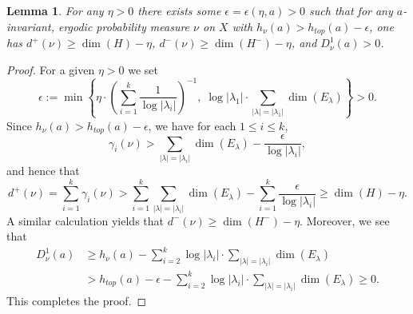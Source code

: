 \documentclass[reqno,12pt]{amsart}
\newtheorem{lemma}[theorem]{Lemma}
\theoremstyle{definition}
\numberwithin{equation}{section}
\newcommand{\Ad}{\mathrm{Ad}}
\begin{document}
{%

\begin{lemma}\label{L:dimclose}
For any $\eta>0$ there exists some $\epsilon=\epsilon(\eta,a)>0$ such that for any $a$-invariant, ergodic probability measure $\nu$ on $X$ with $h_{\nu}(a)>h_{top}(a)-\epsilon$, one has $d^+(\nu)\geq \dim(H)-\eta$, $d^-(\nu)\geq \dim(H^-)-\eta$, and $D^1_{\nu}(a)>0$.
\end{lemma}
\begin{proof}
    For a given $\eta>0$ we set $$\epsilon:=\min\left\{\eta\cdot\left(\sum\limits_{i=1}^k\frac{1}{\log|\lambda_i|}\right)^{-1},\;
    \log|\lambda_1|\cdot\sum\limits_{|\lambda|=|\lambda_1|}\dim(E_{\lambda})
    \right\}>0.$$ 
    Since $h_{\nu}(a)>h_{top}(a)-\epsilon$, we have for each $1\le i\leq k$, $$\gamma_i(\nu)>\sum\limits_{|\lambda|=|\lambda_i|}\dim(E_{\lambda})-\dfrac{\epsilon}{\log|\lambda_i|},$$ and hence that
    $$
    d^+(\nu)=\sum\limits_{i=1}^k\gamma_i(\nu)    >\sum\limits_{i=1}^k\sum\limits_{|\lambda|=|\lambda_i|}\dim(E_{\lambda})-\sum\limits_{i=1}^k\frac{\epsilon}{\log|\lambda_i|}\geq\dim(H)-\eta.
    $$
    A similar calculation yields that $d^-(\nu)\geq \dim(H^-)-\eta$. Moreover, we see that \begin{equation*}
        \begin{aligned}
            D^1_{\nu}(a)&\geq
            h_{\nu}(a)-\sum_{i=2}^k\log|\lambda_i|\cdot\sum\limits_{|\lambda|=
            |\lambda_i|}\dim(E_{\lambda})\\
            &>h_{top}(a)-\epsilon-\sum_{i=2}^k\log|\lambda_i|\cdot\sum\limits_{|\lambda|=|\lambda_i|}\dim(E_{\lambda})
            \geq 0.
        \end{aligned}
    \end{equation*} 
  This completes the proof.  
    \end{proof}

}
\end{document}
